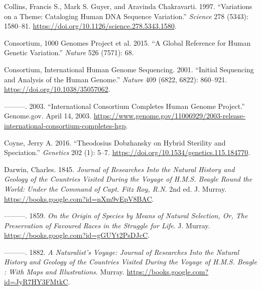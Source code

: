 \documentclass[
]{book}
\newlength{\cslhangindent}
\newlength{\cslentryspacingunit} %
\newenvironment{CSLReferences}[2] %
 {%
  \setlength{\parindent}{0pt}
  \ifodd #1
  \let\oldpar\par
  \def\par{\hangindent=\cslhangindent\oldpar}
  \fi
  \setlength{\parskip}{#2\cslentryspacingunit}
 }%
 {}
\begin{document}
\begin{CSLReferences}{1}{0}
\leavevmode{}%
Collins, Francis S., Mark S. Guyer, and Aravinda Chakravarti. 1997. {``Variations on a {Theme}: {Cataloging Human DNA Sequence Variation}.''} \emph{Science} 278 (5343): 1580--81. \url{https://doi.org/10.1126/science.278.5343.1580}.

\leavevmode{}%
Consortium, 1000 Genomes Project et al. 2015. {``A Global Reference for Human Genetic Variation.''} \emph{Nature} 526 (7571): 68.

\leavevmode{}%
Consortium, International Human Genome Sequencing. 2001. {``Initial Sequencing and Analysis of the Human Genome.''} \emph{Nature} 409 (6822, 6822): 860--921. \url{https://doi.org/10.1038/35057062}.

\leavevmode{}%
---------. 2003. {``International {Consortium Completes Human Genome Project}.''} {Genome.gov}. April 14, 2003. \url{https://www.genome.gov/11006929/2003-release-international-consortium-completes-hgp}.

\leavevmode{}%
Coyne, Jerry A. 2016. {``Theodosius {Dobzhansky} on {Hybrid Sterility} and {Speciation}.''} \emph{Genetics} 202 (1): 5--7. \url{https://doi.org/10.1534/genetics.115.184770}.

\leavevmode{}%
Darwin, Charles. 1845. \emph{Journal of {Researches Into} the {Natural History} and {Geology} of the {Countries Visited During} the {Voyage} of {H}.{M}.{S}. {Beagle Round} the {World}: {Under} the {Command} of {Capt}. {Fitz Roy}, {R}.{N}}. 2nd ed. {J. Murray}. \url{https://books.google.com?id=nXm9vEpV8BAC}.

\leavevmode{}%
---------. 1859. \emph{On the {Origin} of {Species} by {Means} of {Natural Selection}, {Or}, {The Preservation} of {Favoured Races} in the {Struggle} for {Life}}. {J. Murray}. \url{https://books.google.com?id=gGUYt2PsDJcC}.

\leavevmode{}%
---------. 1882. \emph{A {Naturalist}'s {Voyage}: {Journal} of {Researches Into} the {Natural History} and {Geology} of the {Countries Visited During} the {Voyage} of {H}.{M}.{S}. {Beagle} : With {Maps} and {Illustrations}}. {Murray}. \url{https://books.google.com?id=JyR7HY3FMtkC}.


\end{CSLReferences}
\end{document}
